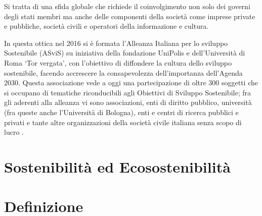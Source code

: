 Si tratta di una sfida globale che richiede il coinvolgimento non solo dei governi degli stati membri ma anche delle componenti della società come imprese private e pubbliche, società civili e operatori della informazione e cultura.

In questa ottica nel 2016 si è formata l'Alleanza Italiana per lo sviluppo Sostenibile (ASviS) \cite{asvis} su iniziativa della fondazione UniPolis e dell'Università di Roma \enquote*{Tor vergata}, con l'obiettivo di diffondere la cultura dello sviluppo sostenibile, facendo accrescere la consapevolezza dell'importanza dell'Agenda 2030.
Questa associazione vede a oggi una partecipazione di oltre 300 soggetti che si occupano di tematiche riconducibili agli Obiettivi di Sviluppo Sostenibile; fra gli aderenti alla alleanza vi sono associazioni, enti di diritto pubblico, università (fra queste anche l'Università di Bologna), enti e centri di ricerca pubblici e privati e tante altre organizzazioni della società civile italiana senza scopo di lucro \cite[Aderenti alla ASviS]{aderenti_asvis}. 
%
%
\section{Sostenibilità ed Ecosostenibilità}
\section{Definizione}
%
%
